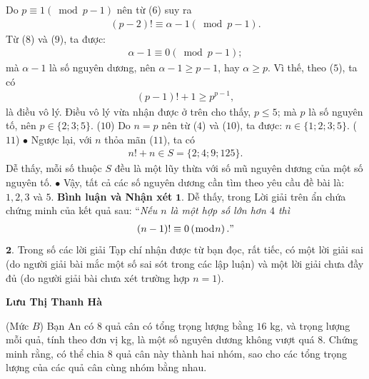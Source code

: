 \begin{multicols}{2}
	Do $p \equiv 1\left( {\bmod p - 1} \right)$  nên từ ($6$) suy ra
	\begin{align*}
		\left( {p - 2} \right)! \equiv \alpha  - 1\left( {\bmod p - 1} \right). \tag{$9$}
	\end{align*}
	Từ ($8$) và ($9$), ta được:
	\begin{align*}
		\alpha  - 1 \equiv 0\left( {\bmod p - 1} \right);
	\end{align*}
	mà $\alpha - 1$ là số nguyên dương, nên $\alpha - 1 \ge p - 1$, hay $\alpha \ge p$. Vì thế, theo ($5$), ta có
	\begin{align*}
		\left( {p - 1} \right)! + 1 \ge {p^{p - 1}},
	\end{align*}
	là điều vô lý.
	\vskip 0.05cm
	Điều vô lý vừa nhận được ở trên cho thấy, $p \le 5$; mà $p$ là số nguyên tố, nên \linebreak$p \in \{2; 3; 5\}$. \hfill      ($10$)
	\vskip 0.05cm
	Do $n = p$ nên từ ($4$) và ($10$), ta được: \linebreak$n \in \{1; 2; 3; 5\}$. \hfill ($11$)
	\vskip 0.05cm
	$\bullet$ Ngược lại, với $n$ thỏa mãn ($11$), ta có
	\begin{align*}
		n! + n \in S = \{2; 4; 9; 125\}.
	\end{align*}
	Dễ thấy, mỗi số thuộc $S$ đều là một lũy thừa với số mũ nguyên dương của một số nguyên tố.
	\vskip 0.05cm
	$\bullet$ Vậy, tất cả các số nguyên dương cần tìm theo yêu cầu đề bài là: $1, 2, 3$ và $5$.
	\vskip 0.05cm 
	\textbf{\color{thachthuctoanhoc}Bình luận và Nhận xét}
	\vskip 0.05cm
	$\pmb{1.}$ Dễ thấy, trong Lời giải trên ẩn chứa chứng minh của kết quả sau:
	\vskip 0.05cm
	``\textit{Nếu $n$ là một hợp số lớn hơn $4$ thì}  
	\begin{align*}
		\left( {n - 1} \right)! \equiv 0\left( {\bmod n} \right)."
	\end{align*}
	$\pmb{2.}$ Trong số các lời giải Tạp chí nhận được từ bạn đọc, rất tiếc, có một lời giải sai (do người giải bài mắc một số sai sót trong các lập luận) và một lời giải chưa đầy đủ (do người giải bài chưa xét trường hợp $n = 1$).
	\begin{flushright}
		\textbf{\color{thachthuctoanhoc}Lưu Thị Thanh Hà}
	\end{flushright}
	{}
	(Mức $B$) Bạn An có $8$ quả cân có tổng trọng lượng bằng $16$ kg, và trọng lượng mỗi quả, tính theo đơn vị kg, là một số nguyên dương không vượt quá $8$. Chứng minh rằng, có thể chia $8$ quả cân này thành hai nhóm, sao cho các tổng trọng lượng của các quả cân cùng nhóm bằng nhau.

\end{multicols}
